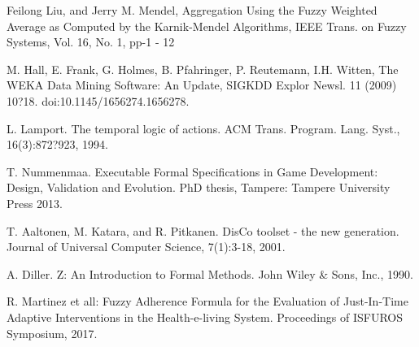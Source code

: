 \documentclass{llncs}
\begin{document}
\begin{thebibliography}{99}
 Feilong Liu,  and Jerry M. Mendel, Aggregation Using the Fuzzy Weighted Average as
Computed by the Karnik-Mendel Algorithms, IEEE Trans. on Fuzzy Systems, Vol. 16, No. 1, pp-1 - 12 

 M. Hall, E. Frank, G. Holmes, B. Pfahringer, P. Reutemann, I.H. Witten, The WEKA Data Mining Software:
An Update, SIGKDD Explor Newsl. 11 (2009) 10?18. doi:10.1145/1656274.1656278.

 L. Lamport. The temporal logic of actions. ACM Trans. Program. Lang. Syst., 16(3):872?923, 1994.

 T. Nummenmaa. Executable Formal Specifications in Game Development: Design, Validation and Evolution. PhD  thesis, Tampere: Tampere University  Press 2013.

 T. Aaltonen, M. Katara, and R. Pitkanen. DisCo toolset - the new generation. Journal of Universal Computer Science, 7(1):3-18, 2001.

  A. Diller. Z: An Introduction to Formal Methods. John Wiley \& Sons, Inc., 1990.

  R. Martinez et all: Fuzzy Adherence Formula for the Evaluation of Just-In-Time Adaptive Interventions in the Health-e-living System. Proceedings of ISFUROS Symposium,  2017.

\end{thebibliography}
\end{document}

